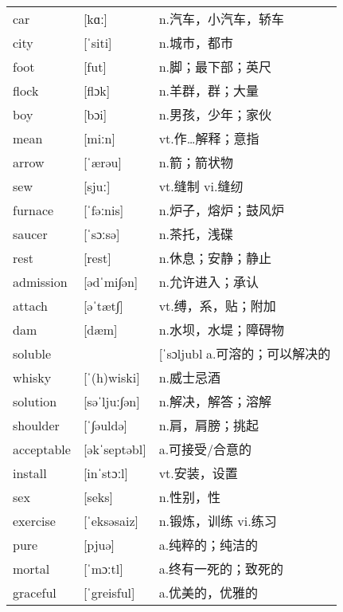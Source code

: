 \documentclass[a4paper]{article}
\begin{document}
\section{}
\begin{tabular}{l l l}

car & [kɑː] & n.汽车，小汽车，轿车 \\
city & [ˈsiti] & n.城市，都市 \\
foot & [fut] & n.脚；最下部；英尺 \\
flock & [flɔk] & n.羊群，群；大量 \\
boy & [bɔi] & n.男孩，少年；家伙 \\
mean & [miːn] & vt.作…解释；意指 \\
arrow & [ˈærəu] & n.箭；箭状物 \\
sew & [sjuː] & vt.缝制 vi.缝纫 \\
furnace & [ˈfəːnis] & n.炉子，熔炉；鼓风炉 \\
saucer & [ˈsɔːsə] & n.茶托，浅碟 \\
rest & [rest] & n.休息；安静；静止 \\
admission & [ədˈmi∫ən] & n.允许进入；承认 \\
attach & [əˈtæt∫] & vt.缚，系，贴；附加 \\
dam & [dæm] & n.水坝，水堤；障碍物 \\
soluble &  & [ˈsɔljubla.可溶的；可以解决的 \\
whisky & [ˈ(h)wiski] & n.威士忌酒 \\
solution & [səˈljuː∫ən] & n.解决，解答；溶解 \\
shoulder & [ˈ∫əuldə] & n.肩，肩膀；挑起 \\
acceptable & [əkˈseptəbl] & a.可接受/合意的 \\
install & [inˈstɔːl] & vt.安装，设置 \\
sex & [seks] & n.性别，性 \\
exercise & [ˈeksəsaiz] & n.锻炼，训练 vi.练习 \\
pure & [pjuə] & a.纯粹的；纯洁的 \\
mortal & [ˈmɔːtl] & a.终有一死的；致死的 \\
graceful & [ˈgreisful] & a.优美的，优雅的 \\

\end{tabular}
\end{document}
